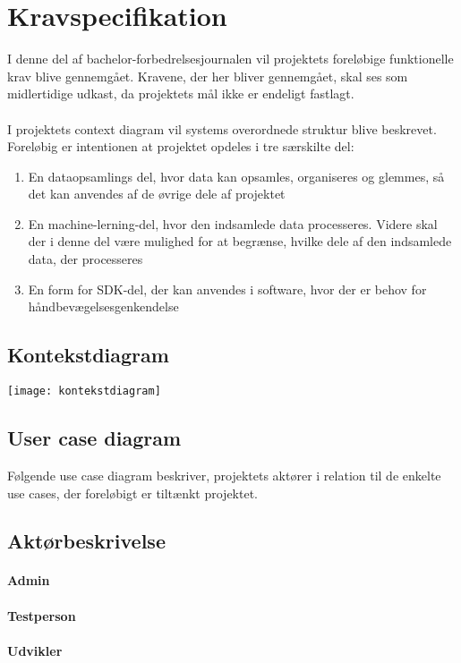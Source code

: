 \thispagestyle{fancy}
\chapter{Kravspecifikation}
I denne del af bachelor-forbedrelsesjournalen vil projektets foreløbige funktionelle krav blive gennemgået. Kravene, der her bliver gennemgået, skal ses som midlertidige udkast, da projektets mål ikke er endeligt fastlagt.
\\ \\
I projektets context diagram vil systems overordnede struktur blive beskrevet. \\
Foreløbig er intentionen at projektet opdeles i tre særskilte del:\\
\begin{enumerate}
	\item En dataopsamlings del, hvor data kan opsamles, organiseres og glemmes, så det kan anvendes af de øvrige dele af projektet
	\item En machine-lerning-del, hvor den indsamlede data processeres. Videre skal der i denne del være mulighed for at begrænse, hvilke dele af den indsamlede data, der processeres
	\item En form for SDK-del, der kan anvendes i software, hvor der er behov for håndbevægelsesgenkendelse	
\end{enumerate}

\section{Kontekstdiagram}
\texttt{[image: kontekstdiagram]}
\section{User case diagram}
Følgende use case diagram beskriver, projektets aktører i relation til de enkelte use cases, der foreløbigt er tiltænkt projektet.

\section{Aktørbeskrivelse}
\subsubsection*{Admin}
\subsubsection*{Testperson}
\subsubsection*{Udvikler}

